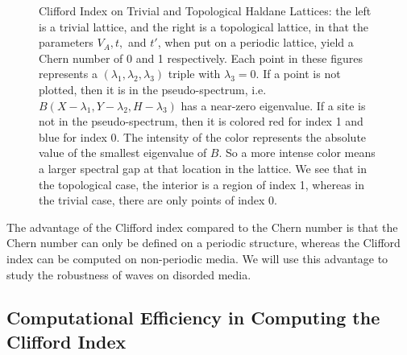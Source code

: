 \documentclass[a4paper]{article}
\begin{document}
\begin{figure}
\centering
{}%
%
\caption{Clifford Index on Trivial and Topological Haldane Lattices: the left is a trivial lattice, and the right is a topological lattice, in that the parameters $V_A, t,$ and $t'$, when put on a periodic lattice, yield a Chern number of 0 and 1 respectively.
Each point in these figures represents a $(\lambda_1,\lambda_2,\lambda_3)$ triple with $\lambda_3 = 0$.
If a point is not plotted, then it is in the pseudo-spectrum, i.e. $B(X - \lambda_1, Y - \lambda_2, H - \lambda_3)$ has a near-zero eigenvalue.
If a site is not in the pseudo-spectrum, then it is colored red for index 1 and blue for index 0.
The intensity of the color represents the absolute value of the smallest eigenvalue of $B$.
So a more intense color means a larger spectral gap at that location in the lattice.
We see that in the topological case, the interior is a region of index 1, whereas in the trivial case, there are only points of index 0.
}%
\label{fig:haldane_index}%
\end{figure}
The advantage of the Clifford index compared to the Chern number is that the Chern number can only be defined on a periodic structure, whereas the Clifford index can be computed on non-periodic media.
We will use this advantage to study the robustness of waves on disorded media.

\subsection{Computational Efficiency in Computing the Clifford Index}
\end{document}
